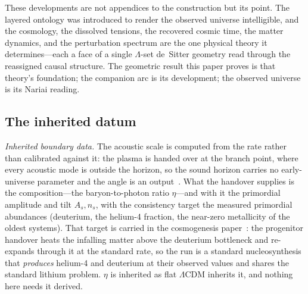 \documentclass[11pt,a4paper]{article}
\theoremstyle{plain}
\theoremstyle{definition}
\theoremstyle{remark}
\begin{document}
These developments are not appendices to the construction but its point. The layered ontology was introduced to render the observed universe intelligible, and the cosmology, the dissolved tensions, the recovered cosmic time, the matter dynamics, and the perturbation spectrum are the one physical theory it determines---each a face of a single $\Lambda$-set de~Sitter geometry read through the reassigned causal structure. The geometric result this paper proves is that theory's foundation; the companion arc is its development; the observed universe is its Nariai reading.

\subsection{The inherited datum}\label{sec:inherited-datum}

\emph{Inherited boundary data.} The acoustic scale is computed from the rate rather than calibrated against it: the plasma is handed over at the branch point, where every acoustic mode is outside the horizon, so the sound horizon carries no early-universe parameter and the angle is an output~\cite{JanzenCRcosmology}. What the handover supplies is the composition---the baryon-to-photon ratio $\eta$---and with it the primordial amplitude and tilt $A_s,n_s$, with the consistency target the measured primordial abundances (deuterium, the helium-4 fraction, the near-zero metallicity of the oldest systems). That target is carried in the cosmogenesis paper~\cite{JanzenCosmogenesis}: the progenitor handover heats the infalling matter above the deuterium bottleneck and re-expands through it at the standard rate, so the run is a standard nucleosynthesis that \emph{produces} helium-4 and deuterium at their observed values and shares the standard lithium problem. $\eta$ is inherited as flat $\Lambda$CDM inherits it, and nothing here needs it derived.
\end{document}

